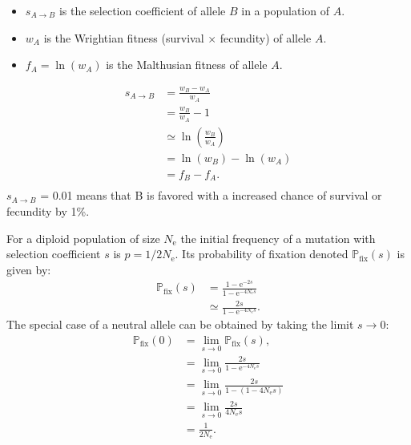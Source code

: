 \documentclass[8pt]{beamer}
\newcommand{\e}{\text{e}}
\newcommand{\Ne}{N_{\text{e}}}
\newcommand{\proba}{\mathbb{P}}
\newcommand{\pfix}{\proba_{\text{fix}}}
\newcommand{\AtoB}{A \rightarrow B}
\begin{document}
	\begin{frame}
		\begin{itemize}[label=$\bullet$]
			\item $s_{\AtoB}$ is the selection coefficient of allele $B$ in a population of $A$.
			\item $w_A$ is the Wrightian fitness (survival $\times$ fecundity) of allele $A$.
			\item $f_A = \ln (w_A) $ is the Malthusian fitness of allele $A$.
		\end{itemize}
		\begin{align*}
			s_{\AtoB} &  = \frac{w_B - w_A}{w_A} \\
							     &  = \frac{w_B}{w_A} - 1 \\
								 &  \simeq \ln \left( \frac{w_B}{w_A} \right) \\
								 &  = \ln (w_B) - \ln (w_A) \\
								 &  = f_B - f_A. \\
		\end{align*}
		$s_{\AtoB}$ = 0.01 means that B is favored with a increased chance of survival or fecundity by 1\%.
	\end{frame}
	\begin{frame}
		For a diploid population of size $\Ne$ the initial frequency of a mutation with selection coefficient $s$ is $p = 1/2\Ne$. Its probability of fixation
denoted $\pfix(s)$ is given by:
		\begin{align*}
		\pfix(s) &  = \frac{1 - \e^{ -2s}}{1 - \e^{ -4 \Ne s}}  \\
		 	     & \simeq \frac{2s}{1 - \e^{ -4 \Ne s}}.
		\end{align*}
		The special case of a neutral allele can be obtained by taking the limit $s \rightarrow 0$:
		\begin{align*}
			\pfix(0) &  = \lim_{s \rightarrow 0} \pfix(s), \\
					 &  = \lim_{s \rightarrow 0} \frac{2s}{1 - \e^{ -4 \Ne s}} \\
					 &  = \lim_{s \rightarrow 0} \frac{2s}{1 - (1 - 4 \Ne s)} \\
					 &  = \lim_{s \rightarrow 0} \frac{2s}{4 \Ne s} \\
					 & = \frac{1}{2 \Ne}.
		\end{align*}
	\end{frame}
\end{document}
